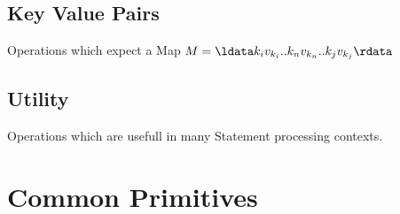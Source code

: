 \documentclass{article}
\begin{document}
\subsection{Key Value Pairs}
Operations which expect a Map $M = \ldata k_{i}v_{k_{i}}..k_{n}v_{k_{n}}..k_{j}v_{k_{j}} \rdata$






\subsection{Utility}
Operations which are usefull in many Statement processing contexts.





\section{Common Primitives}



%

%
\end{document}
